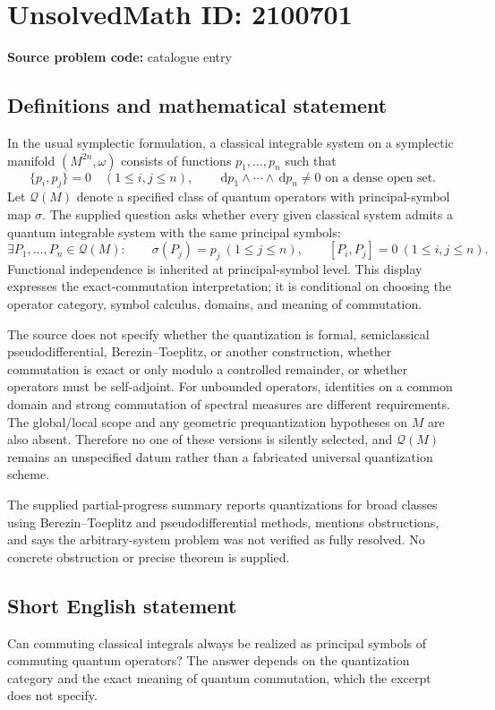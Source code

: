 \documentclass[11pt]{article}
\newcommand{\dd}{\,\mathrm{d}}
\begin{document}
\section*{UnsolvedMath ID: 2100701}
\textbf{Source problem code:} catalogue entry
\subsection{Definitions and mathematical statement}
In the usual symplectic formulation, a classical integrable system on a symplectic manifold \((M^{2n},\omega)\) consists of functions \(p_1,\ldots,p_n\) such that
\[
\{p_i,p_j\}=0\quad(1\le i,j\le n),\qquad
\dd p_1\wedge\cdots\wedge\dd p_n\ne0
\text{ on a dense open set}.
\]
Let \(\mathcal Q(M)\) denote a specified class of quantum operators with principal-symbol map \(\sigma\). The supplied question asks whether every given classical system admits a quantum integrable system with the same principal symbols:
\[
\exists P_1,\ldots,P_n\in\mathcal Q(M):\qquad
\sigma(P_j)=p_j\ (1\le j\le n),\qquad
[P_i,P_j]=0\ (1\le i,j\le n).
\]
Functional independence is inherited at principal-symbol level. This display expresses the exact-commutation interpretation; it is conditional on choosing the operator category, symbol calculus, domains, and meaning of commutation.

The source does not specify whether the quantization is formal, semiclassical pseudodifferential, Berezin--Toeplitz, or another construction, whether commutation is exact or only modulo a controlled remainder, or whether operators must be self-adjoint. For unbounded operators, identities on a common domain and strong commutation of spectral measures are different requirements. The global/local scope and any geometric prequantization hypotheses on \(M\) are also absent. Therefore no one of these versions is silently selected, and \(\mathcal Q(M)\) remains an unspecified datum rather than a fabricated universal quantization scheme.

The supplied partial-progress summary reports quantizations for broad classes using Berezin--Toeplitz and pseudodifferential methods, mentions obstructions, and says the arbitrary-system problem was not verified as fully resolved. No concrete obstruction or precise theorem is supplied.
\subsection{Short English statement}
Can commuting classical integrals always be realized as principal symbols of commuting quantum operators? The answer depends on the quantization category and the exact meaning of quantum commutation, which the excerpt does not specify.
\end{document}
